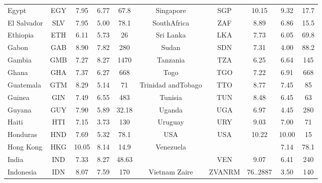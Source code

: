 \begin{table}[htbp]
\begin{tabular}{lccccccccc}
Egypt & EGY & 7.95 & 6.77 & 67.8 & Singapore & SGP & 10.15 & 9.32 & 17.7 \\
El Salvador & SLV & 7.95 & 5.00 & 78.1 & SouthAfrica & ZAF & 8.89 & 6.86 & 15.5 \\
Ethiopia & ETH & 6.11 & 5.73 & 26 & Sri Lanka & LKA & 7.73 & 6.05 & 69.8 \\
Gabon & GAB & 8.90 & 7.82 & 280 & Sudan & SDN & 7.31 & 4.00 & 88.2 \\
Gambia & GMB & 7.27 & 8.27 & 1470 & Tanzania & TZA & 6.25 & 6.64 & 145 \\
Ghana & GHA & 7.37 & 6.27 & 668 & Togo & TGO & 7.22 & 6.91 & 668 \\
Guatemala & GTM & 8.29 & 5.14 & 71 & Trinidad andTobago & TTO & 8.77 & 7.45 & 85 \\
Guinea & GIN & 7.49 & 6.55 & 483 & Tunisia & TUN & 8.48 & 6.45 & 63 \\
Guyana & GUY & 7.90 & 5.89 & 32.18 & Uganda & UGA & 6.97 & 4.45 & 280 \\
Haiti & HTI & 7.15 & 3.73 & 130 & Uruguay & URY & 9.03 & 7.00 & 71 \\
Honduras & HND & 7.69 & 5.32 & 78.1 & USA & USA & 10.22 & 10.00 & 15 \\
Hong Kong & HKG & 10.05 & 8.14 & 14.9 & Venezuela &  &  & 7.14 & 78.1 \\
India & IND & 7.33 & 8.27 & 48.63 &  & VEN & 9.07 & 6.41 & 240 \\
Indonesia & IDN & 8.07 & 7.59 & 170 & Vietnam Zaire & ZVANRM & 76..2887 & 3.50 & 140 \\
\hline
\end{tabular}
\end{table}
